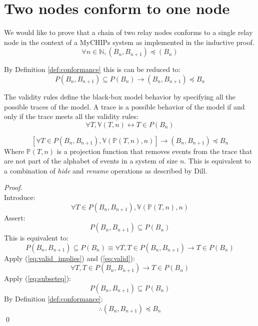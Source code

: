 \documentclass[runningheads]{llncs}
\newcommand{\actsvalid}[2]{\mathds{V}(#1, #2)}
\newcommand{\projectsize}[2]{\mathds{P}(#1, #2)}
\begin{document}
\section{Two nodes conform to one node}
\label{chap:coq_results}

We would like to prove that a chain of two relay nodes conforms to a single relay node in the context of a MyCHIPs system as implemented in the inductive proof.
$$\forall n \in \mathds{N}, (B_n, B_{n+1}) \preceq (B_n)
$$

By Definition \ref{def:conformance} this is can be reduced to:
$$P(B_n, B_{n+1}) \subseteq P(B_n) \longrightarrow (B_n, B_{n+1}) \preceq B_n$$

The validity rules define the black-box model behavior by specifying all the possible traces of the model. A trace is a possible behavior of the model if and only if the trace meets all the validity rules:
\begin{equation}
\label{eq:valid_implies}
\forall T, \actsvalid{T}{n} \leftrightarrow
 T \in P(B_n)
\end{equation}

\begin{theorem}
\label{thm:valid_imp_conf}
$$
\left[ \forall T \in P(B_n, B_{n+1}), \actsvalid{\projectsize{T}{n}}{n} \right] \longrightarrow (B_n, B_{n+1}) \preceq B_n
$$
Where $\projectsize{T}{n}$ is a projection function that removes events from the trace that are not part of the alphabet of events in a system of size $n$. This is equivalent to a combination of \emph{hide} and \emph{rename} operations as described by Dill. 
\begin{proof}\ \\
Introduce: 
\begin{equation}
\label{eq:valid}
\forall T \in P(B_n, B_{n+1}), \actsvalid{\projectsize{T}{n}}{n}
\end{equation}
Assert:
\begin{equation}
P(B_n, B_{n+1}) \subseteq P(B_n)
\end{equation}
This is equivalent to:
\begin{equation}
\label{eq:subseteq}
P(B_n, B_{n+1}) \subseteq P(B_n) \equiv \forall T, T \in P(B_n, B_{n+1}) \longrightarrow T \in P(B_n)
\end{equation}
Apply (\ref{eq:valid_implies}) and (\ref{eq:valid}):
\begin{equation}
\forall T, T \in P(B_n, B_{n+1}) \longrightarrow T \in P(B_n)
\end{equation}
Apply (\ref{eq:subseteq}):
\begin{equation}
    \label{eq:goal2}
    P(B_n, B_{n+1}) \subseteq P(B_n)
\end{equation}
By Definition \ref{def:conformance}:
\begin{equation}
\therefore (B_n, B_{n+1}) \preceq B_n
\end{equation}
\qed
\end{proof}
\end{theorem}
\end{document}
